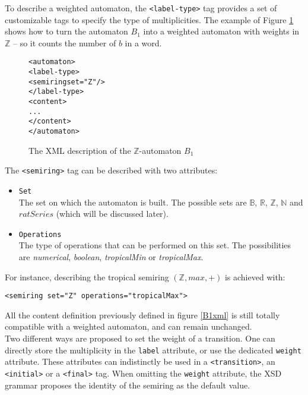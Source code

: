 \documentclass[a4paper]{article}
\def\typetagend{\texttt{</label-type>}}
\def\typetag{\texttt{<label-type>}}
\def\transitiontag{\texttt{<transition>}}
\def\finaltag{\texttt{<final>}}
\def\initialtag{\texttt{<initial>}}
\def\semiringtag{\texttt{<semiring>}}
\begin{document}
To describe a weighted automaton, the \typetag{} tag provides a set
of customizable tags to specify the type of multiplicities. The example
of Figure \ref{B1Zxml} shows how to turn the automaton $B_1$ into a
weighted automaton with weights in ${\mathbb Z}$ -- so it counts the
number of $b$ in a word.

{\small

\begin{figure}[h]
  \begin{center}
\begin{alltt}
<automaton>
  \typetag{}
     <semiring set="Z"/>
  \typetagend{}
  <content>
  ...
  </content>
</automaton>
\end{alltt}

\caption{The XML description of the $\mathbb{Z}$-automaton $B_1$}
\label{B1Zxml}
  \end{center}
\end{figure}

}

The \semiringtag{} tag can be described with two attributes:
\begin{itemize}
  \item \texttt{Set}\\
    The set on which the automaton is built. The possible sets are
    ${\mathbb B}$, ${\mathbb R}$, ${\mathbb Z}$, ${\mathbb N}$ and $ratSeries$
    (which will be discussed later).
  \item \texttt{Operations}\\
    The type of operations that can be performed on this set.
    The possibilities are \textit{numerical}, \textit{boolean}, \textit{tropicalMin}
    or \textit{tropicalMax}.
\end{itemize}

For instance, describing the tropical semiring $({\mathbb Z}, max, +)$
is achieved with:
\begin{center}
{\small
\verb|<semiring set="Z" operations="tropicalMax">|}
\end{center}

All the content definition previously defined in figure \ref{B1xml} is
still totally compatible with a weighted automaton, and can remain
unchanged.\\

Two different ways are proposed to set the weight of a transition. One
can directly store the multiplicity in the \verb|label| attribute, or
use the dedicated \verb|weight| attribute. These attributes can
indistinctly be used in a \transitiontag{}, an \initialtag{} or a
\finaltag{} tag. When omitting the \verb|weight| attribute, the XSD
grammar proposes the identity of the semiring as the default
value.\\\\
\end{document}
